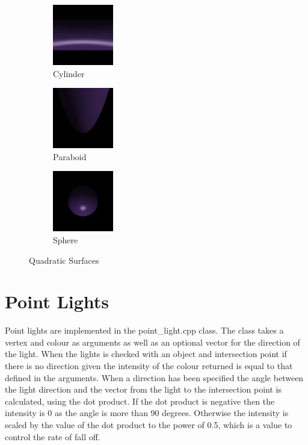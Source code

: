 \documentclass{article}
\begin{document}
\begin{figure}[H]
\centering
\begin{subfigure}{.3\textwidth}
  \centering
  \includegraphics[width=100px]{Images/quadCylinder.png}
  \caption{Cylinder}
\end{subfigure}%
\begin{subfigure}{.3\textwidth}
  \centering
  \includegraphics[width=100px]{Images/quadParaboid.png}
  \caption{Paraboid}
\end{subfigure}
\begin{subfigure}{.3\textwidth}
  \centering
  \includegraphics[width=100px]{Images/quadSphere.png}
  \caption{Sphere}
\end{subfigure}
\caption{Quadratic Surfaces}
\label{fig:quadsurface}
\end{figure}

\section{Point Lights}

Point lights are implemented in the point\_light.cpp class. The class takes a vertex
and colour as arguments as well as an optional vector for the direction of the light.
When the lights is checked with an object and intersection point if there is no direction
given the intensity of the colour returned is equal to that defined in the arguments.
When a direction has been specified the angle between the light direction and the
vector from the light to the intersection point is calculated, using the dot product.
If the dot product is negative then the intensity is 0 as the angle is more than
90 degrees. Otherwise the intensity is scaled by the value of the dot product
to the power of 0.5, which is a value to control the rate of fall off.\\
\end{document}
